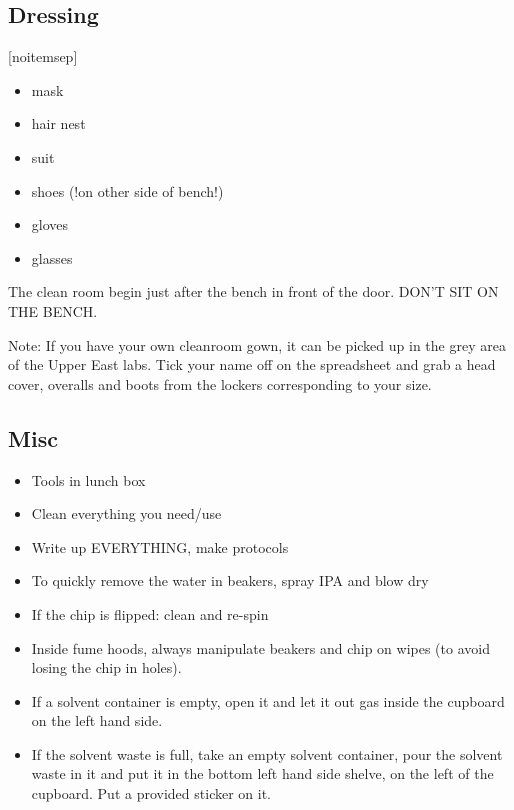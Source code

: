 \newpage

\subsection{Dressing}[noitemsep]
\begin{itemize}
\item mask
\item hair nest
\item suit
\item shoes (!on other side of bench!)
\item gloves
\item glasses
\end{itemize}

The clean room begin just after the bench in front of the door. DON'T SIT ON THE BENCH.

Note: If you have your own cleanroom gown, it can be picked up in the grey area of the Upper East labs.
Tick your name off on the spreadsheet and grab a head cover, overalls and boots from the lockers corresponding
to your size.

\subsection{Misc}

\begin{itemize}
\item Tools in lunch box
\item Clean everything you need/use
\item Write up EVERYTHING, make protocols
\item To quickly remove the water in beakers, spray IPA and blow dry
\item If the chip is flipped: clean and re-spin
\item Inside fume hoods, always manipulate beakers and
chip on wipes (to avoid losing the chip in holes).
\item If a solvent container is empty, open it and let it out gas inside
the cupboard on the left hand side.
\item If the solvent waste is full, take an empty solvent container,
pour the solvent waste in it and put it in the bottom left hand
side shelve, on the left of the cupboard. Put a provided sticker
on it.
\end{itemize}

\newpage

